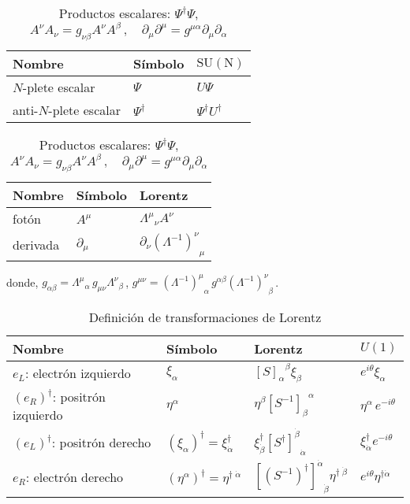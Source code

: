 \begin{frame}

\begin{table}
  \centering
   \begin{tabular}{lll}
    Nombre & Símbolo & $\operatorname{SU(N)}$ \\\hline
    $N$-plete escalar & $\Psi$ & $U \Psi$ \\
    anti-$N$-plete escalar & $\Psi^\dagger $ & $\Psi^\dagger U^\dagger $ \\\hline
    \end{tabular}\hspace{3cm}
   \begin{tabular}{lll}
    Nombre & Símbolo & Lorentz \\\hline
    fotón & $A^\mu$ & ${\Lambda^\mu}_\nu A^\nu$ \\
    derivada & $\partial_\mu$ & $\partial_\nu {\left(\Lambda^{-1}\right)^\nu}_\mu$ \\\hline
  \end{tabular}
  \caption{
       Productos escalares: $\Psi^\dagger \Psi$,  \hspace{4cm}
      $A^\nu A_\nu= g_{\nu \beta}  A^\nu  A^{\beta}\,,\quad \partial_\mu  \partial^\mu=g^{\mu\alpha}\partial_\mu\partial_{\alpha}$
}
  \label{tab:fermionlr}
\end{table}
donde,
 $g_{\alpha\beta}={\Lambda^{\mu}}_{\alpha}\,g_{\mu\nu}{\Lambda^{\nu}}_{\beta}\,$,
  $g^{\mu\nu}={\left( \Lambda^{-1} \right)^{\mu}}_{\alpha}\,g^{\alpha\beta} {\left( \Lambda^{-1} \right)^{\nu}}_{\beta}\,$.


\begin{table}
  \centering
  \begin{tabular}{llll}
    Nombre & Símbolo & Lorentz & $U(1)$\\\hline\hline
    $e_L$: electrón izquierdo & $\xi_{\alpha}$ & ${\left[ S \right]_{\alpha}}^{\beta}\xi_{\beta}$ & $e^{i\theta}\xi_\alpha$\\
   $\left( e_R \right)^{\dagger}$: positrón izquierdo&$\eta^{\alpha}$& $\eta^\beta{\left[  S^{-1}  \right]_{\beta}}^{\alpha}$ & $\eta^\alpha\, e^{-i\theta}$\\
    \hline    
    $\left( e_L \right)^{\dagger}$: positrón derecho   & $\left( \xi_{\alpha} \right)^{\dagger}=\xi^{\dagger}_{\dot{\alpha}}$ &
     $\xi^{\dagger}_{\dot{\beta}}{\left[{S^{\dagger}}\right]^{\dot{\beta}}}_{\dot{\alpha}}$ & $\xi^\dagger_{\dot{\alpha}} e^{-i\theta}$\\
   $e_R$: electrón derecho   & $\left( \eta^{\alpha} \right)^{\dagger}=\eta^{\dagger\;\dot{\alpha}}$ & ${\left[ \left( S^{-1} \right)^\dagger \right]^{\dot{\alpha}}}_{\dot{\beta}}\eta^{\dagger\;\dot{\beta}}$& $e^{i\theta}\eta^{\dagger\dot{\alpha}}$ \\\hline\hline
  \end{tabular}
  \caption{Definición de transformaciones de Lorentz}
  \label{tab:fermionlr}
\end{table}


\end{frame}
